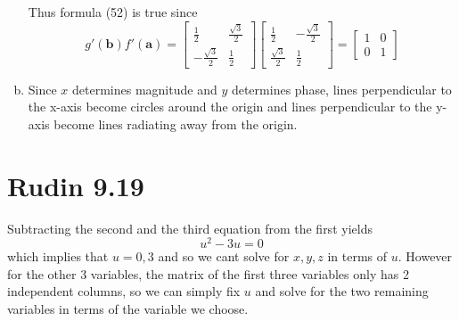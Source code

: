 \documentclass{article}
\begin{document}
\begin{enumerate}[(a)]
\[  \]
  Thus formula (52) is true since
  \[
    g'(\bm{b})f'(\bm{a}) = 
    \begin{bmatrix}
      \frac{1}{2} & \frac{\sqrt{3}}{2} \\
      -\frac{\sqrt{3}}{2} & \frac{1}{2}
    \end{bmatrix}
    \begin{bmatrix}
      \frac{1}{2} & -\frac{\sqrt{3}}{2} \\
      \frac{\sqrt{3}}{2} & \frac{1}{2}
    \end{bmatrix}  
    = \begin{bmatrix}
      1 & 0 \\
      0 & 1
    \end{bmatrix}
  \]
  \item Since $x$ determines magnitude and $y$ determines phase,
  lines perpendicular to the x-axis become circles around the origin and 
  lines perpendicular to the y-axis become lines radiating away from the origin.
\end{enumerate}
\newpage 

\section*{Rudin 9.19}
Subtracting the second and the third equation from the first yields 
\[
  u^2 - 3u = 0
\]
which implies that $u=0,3$ and so we cant solve for $x,y,z$ in terms of $u$. 
However for the other $3$ variables,
the matrix of the first three variables only has
2 independent columns, so we can simply fix $u$ and solve for 
the two remaining variables in terms of the variable we choose.
\end{document}
